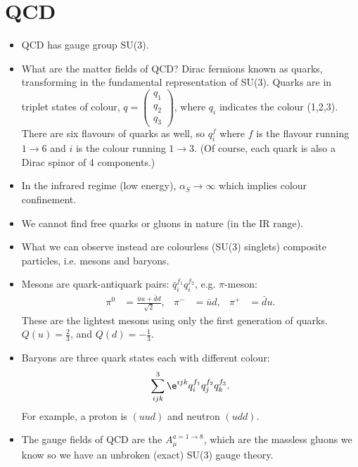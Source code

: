 \documentclass[relqm.tex]{subfiles}
\begin{document}
\section{QCD}
\begin{itemize}
    \item QCD has gauge group SU(3).
    \item What are the matter fields of QCD? Dirac fermions known as quarks, transforming in the fundamental representation of SU(3). 
        Quarks are in triplet states of colour, $q=\begin{pmatrix}q_1\\q_2\\q_3\end{pmatrix}$, where $q_i$ indicates the colour (1,2,3). 
        There are six flavours of quarks as well, so $q^f_i$ where $f$ is the flavour running $1\to6$ and $i$ is the colour running $1\to3$. 
        (Of course, each quark is also a Dirac spinor of 4 components.)
    \item In the infrared regime (low energy), $\alpha_S\to\infty$ which implies colour confinement.
    \item We cannot find free quarks or gluons in nature (in the IR range).
    \item What we can observe instead are colourless (SU(3) singlets) composite particles, i.e. mesons and baryons. 
    \item Mesons are quark-antiquark pairs: $\bar{q}_i^{f_1}q_i^{f_2}$, e.g. $\pi$-meson:
        \begin{align}
            \pi^0 &= \frac{\bar{u}u + \bar{d}d}{\sqrt{2}}, &
            \pi^- &= \bar{u}d, &
            \pi^+ &= \bar{d}u.
        \end{align}
        These are the lightest mesons using only the first generation of quarks. 
        $Q(u) = \frac23$, and $Q(d)=-\frac13$.
    \item Baryons are three quark states each with different colour:
        \begin{align}
            \sum_{ijk}^3 \e^{ijk}q^{f_1}_iq^{f_2}_jq^{f_3}_k.
        \end{align}
        For example, a proton is $(uud)$ and neutron $(udd)$.
    \item The gauge fields of QCD are the $A_\mu^{a=1\to8}$, which are the massless gluons we know so we have an unbroken (exact) SU(3) gauge theory.
\end{itemize}
\end{document}
